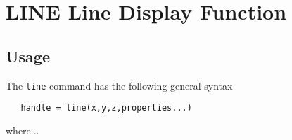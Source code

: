 \section{LINE Line Display Function}

\subsection{Usage}

The \verb|line| command has the following general syntax
\begin{verbatim}
   handle = line(x,y,z,properties...)
\end{verbatim}
where...
